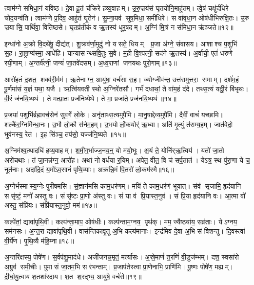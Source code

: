 त्वाम॑ग्ने समिधा॒नं य॑विष्ठ। दे॒वा दू॒तं च॑क्रिरे हव्य॒वाहम्। उ॒रु॒ज्रय॑सं घृ॒तयो॑नि॒माहु॑तम्। त्वे॒षं चक्षु॑र्दधिरे चोद॒यन्व॑ति। त्वाम॑ग्ने प्र॒दिव॒ आहु॑तं घृ॒तेन॑। सु॒म्ना॒यव॑ सुष॒मिधा॒ समी॑धिरे। स वा॑वृधा॒न ओष॑धीभिरुक्षि॒तः। उ॒रु ज्रयासि॒ पार्थि॑वा॒ विति॑ष्ठसे। घृ॒तप्र॑तीकं व ऋ॒तस्य॑ धूर्॒षदम्। अ॒ग्निं मि॒त्रं न स॑मिधा॒न ऋ॑ञ्जते॥१२॥

इन्धा॑नो अ॒क्रो वि॒दथे॑षु॒ दीद्य॑त्। शु॒क्रव॑र्णा॒मुदु॑ नो यसते॒ धियम्। प्र॒जा अ॑ग्ने॒ संवा॑सय। आशाश्च प॒शुभि॑ स॒ह। रा॒ष्ट्राण्य॑स्मा॒ आधे॑हि। यान्यासन्थ्सवि॒तुः स॒वे। म॒ही वि॒श्पत्नी॒ सद॑ने ऋ॒तस्य॑। अ॒र्वाची॒ एतं॑ धरुणे रयी॒णाम्। अ॒न्तर्व॑त्नी॒ जन्यं॑ जा॒तवे॑दसम्। अ॒ध्व॒राणां जनयथः पुरो॒गाम्॥१३॥

आरो॑हतं द॒शत॒ शक्व॑री॒र्मम॑। ऋ॒तेनाग्न॒ आयु॑षा॒ वर्च॑सा स॒ह। ज्योग्जीव॑न्त॒ उत्त॑रामुत्तरा॒ समाम्। दर्\mbox{}श॑म॒हं पू॒र्णमा॑सं य॒ज्ञं यथा॒ यजै। ऋत्वि॑यवती स्थो अ॒ग्निरे॑तसौ। गर्भं॑ दधाथां॒ ते वा॑म॒हं द॑दे। तथ्स॒त्यं यद्वी॒रं बि॑भृथः। वी॒रं ज॑नयि॒ष्यथ॑। ते मत्प्रा॒तः प्रज॑निष्येथे। ते मा॒ प्रजा॑ते॒ प्रज॑नयि॒ष्यथ॑॥१४॥

प्र॒जया॑ प॒शुभि॑र्ब्रह्मवर्च॒सेन॑ सुव॒र्गे लो॒के। अनृ॑ताथ्स॒त्यमुपै॑मि। मा॒नु॒षाद्देव्य॒मुपै॑मि। दैवीं॒ वाचं॑ यच्छामि। शल्कै॑र॒ग्निमि॑न्धा॒नः। उ॒भौ लो॒कौ स॑नेम॒हम्। उ॒भयोर्लो॒कयोर्॑ ऋ॒ध्वा। अति॑ मृ॒त्युं त॑राम्य॒हम्। जात॑वेदो॒ भुव॑नस्य॒ रेत॑। इ॒ह सि॑ञ्च॒ तप॑सो॒ यज्ज॑नि॒ष्यते॥१५॥

अ॒ग्निम॑श्व॒त्थादधि॑ हव्य॒वाहम्। श॒मी॒ग॒र्भाज्ज॒नय॒न्॒ यो म॑यो॒भूः। अ॒यं ते॒ योनि॑र्‌ऋ॒त्विय॑। यतो॑ जा॒तो अरो॑चथाः। तं जा॒नन्न॑ग्न॒ आरो॑ह। अथा॑ नो वर्धया र॒यिम्। अपे॑त॒ वीत॒ वि च॑ सर्प॒तात॑। येऽत्र॒ स्थ पु॑रा॒णा ये च॒ नूत॑नाः। अदा॑दि॒दं य॒मो॑ऽव॒सानं॑ पृथि॒व्याः। अक्र॑न्नि॒मं पि॒तरो॑ लो॒कम॑स्मै॥१६॥

अ॒ग्नेर्भस्मास्य॒ग्नेः पुरी॑षमसि। सं॒ज्ञान॑मसि काम॒धर॑णम्। मयि॑ ते काम॒धर॑णं भूयात्। संव॑ सृजामि॒ हृद॑यानि। ससृ॑ष्टं॒ मनो॑ अस्तु वः। संसृ॑ष्टः प्रा॒णो अ॑स्तु वः। सं या व॑ प्रि॒यास्त॒नुव॑। सं प्रि॒या हृद॑यानि वः। आ॒त्मा वो॑ अस्तु॒ संप्रि॑यः। संप्रि॑यास्त॒नुवो॒ मम॑॥१७॥

कल्पे॑तां॒ द्यावा॑पृथि॒वी। कल्प॑न्ता॒माप॒ ओष॑धीः। कल्प॑न्ताम॒ग्नय॒ पृथ॑क्। मम॒ ज्यैष्ठ्या॑य॒ सव्र॑ताः। येऽग्नय॒ सम॑नसः। अ॒न्त॒रा द्यावा॑पृथि॒वी। वास॑न्तिकावृ॒तू अ॒भि कल्प॑मानाः। इन्द्र॑मिव दे॒वा अ॒भि सं वि॑शन्तु। दि॒वस्त्वा॑ वी॒र्ये॑ण। पृ॒थि॒व्यै म॑हि॒म्ना॥१८॥

अ॒न्तरि॑क्षस्य॒ पोषे॑ण। स॒र्वप॑शु॒माद॑धे। अजी॑जनन्न॒मृतं॒ मर्त्या॑सः। अ॒स्रे॒माणं॑ त॒रणिं॑ वी॒डुज॑म्भम्। दश॒ स्वसा॑रो अ॒ग्रुव॑ समी॒चीः। पुमासं जा॒तम॒भि सर॑भन्ताम्। प्र॒जाप॑तेस्त्वा प्रा॒णेनाभि॒ प्राणि॑मि। पू॒ष्णः पोषे॑ण॒ मह्यम्। दी॒र्घा॒यु॒त्वाय॑ श॒तशा॑रदाय। श॒त श॒रद्भ्य॒ आयु॑षे॒ वर्च॑से॥१९॥

